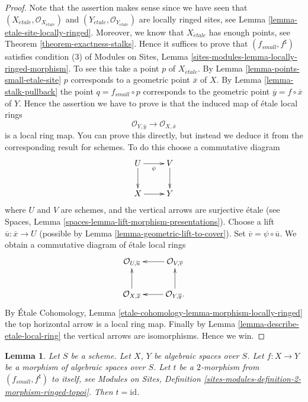 \documentclass{stacks-project}
\theoremstyle{plain}
\newtheorem{lemma}[subsection]{Lemma}
\theoremstyle{definition}
\theoremstyle{remark}
\numberwithin{equation}{subsection}
\def\etale{{\acute{e}tale}}
\begin{document}
\begin{proof}
Note that the assertion makes sense since we have seen that
$(X_\etale, \mathcal{O}_{X_\etale})$ and
$(Y_\etale, \mathcal{O}_{Y_\etale})$
are locally ringed sites, see
Lemma \ref{lemma-etale-site-locally-ringed}.
Moreover, we know that $X_\etale$ has enough points, see
Theorem \ref{theorem-exactness-stalks}.
Hence it suffices to prove that $(f_{small}, f^\sharp)$
satisfies condition (3) of
Modules on Sites,
Lemma \ref{sites-modules-lemma-locally-ringed-morphism}.
To see this take a point $p$ of $X_\etale$. By
Lemma \ref{lemma-points-small-etale-site}
$p$ corresponds to a geometric point $\overline{x}$ of $X$.
By
Lemma \ref{lemma-stalk-pullback}
the point $q = f_{small} \circ p$ corresponds to the
geometric point $\overline{y} = f \circ \overline{x}$ of $Y$.
Hence the assertion we have to prove is that the induced map
of \'etale local rings
$$
\mathcal{O}_{Y, \overline{y}} \longrightarrow \mathcal{O}_{X, \overline{x}}
$$
is a local ring map. You can prove this directly, but instead we deduce it
from the corresponding result for schemes. To do this choose a commutative
diagram
$$
\xymatrix{
U \ar[d] \ar[r]_\psi & V \ar[d] \\
X \ar[r] & Y
}
$$
where $U$ and $V$ are schemes, and the vertical arrows are surjective
\'etale (see
Spaces, Lemma \ref{spaces-lemma-lift-morphism-presentations}).
Choose a lift $\overline{u} : \overline{x} \to U$ (possible by
Lemma \ref{lemma-geometric-lift-to-cover}).
Set $\overline{v} = \psi \circ \overline{u}$. We obtain a commutative
diagram of \'etale local rings
$$
\xymatrix{
\mathcal{O}_{U, \overline{u}} &
\mathcal{O}_{V, \overline{v}} \ar[l] \\
\mathcal{O}_{X, \overline{x}} \ar[u] &
\mathcal{O}_{Y, \overline{y}}. \ar[l] \ar[u]
}
$$
By
\'Etale Cohomology, Lemma \ref{etale-cohomology-lemma-morphism-locally-ringed}
the top horizontal arrow is a local ring map. Finally by
Lemma \ref{lemma-describe-etale-local-ring}
the vertical arrows are isomorphisms. Hence we win.
\end{proof}

\begin{lemma}
\label{lemma-2-morphism}
Let $S$ be a scheme.
Let $X$, $Y$ be algebraic spaces over $S$.
Let $f : X \to Y$ be a morphism of algebraic spaces over $S$.
Let $t$ be a $2$-morphism from $(f_{small}, f^\sharp)$ to itself, see
Modules on Sites,
Definition \ref{sites-modules-definition-2-morphism-ringed-topoi}.
Then $t = \text{id}$.
\end{lemma}
\end{document}
